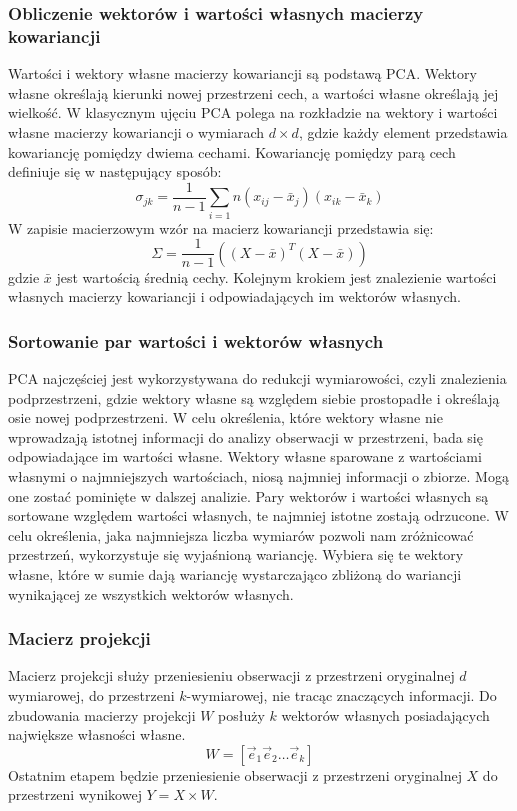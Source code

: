\documentclass[a4paper,12pt,twoside,openany]{report}
\begin{document}
\subsubsection{Obliczenie wektorów i wartości własnych macierzy kowariancji}
Wartości i wektory własne macierzy kowariancji są podstawą PCA.
Wektory własne określają kierunki nowej przestrzeni cech, a wartości własne określają jej wielkość.
W klasycznym ujęciu PCA polega na rozkładzie na wektory i wartości własne macierzy kowariancji o wymiarach $d \times d$,
gdzie każdy element przedstawia kowariancję pomiędzy dwiema cechami. 
Kowariancję pomiędzy parą cech definiuje się w następujący sposób:
\begin{equation}
	\sigma_{jk}=\frac{1}{n - 1}\sum_{i=1}{n}(x_{ij}-\bar x_j)(x_{ik} - \bar x_k)
\end{equation}
W zapisie macierzowym wzór na macierz kowariancji przedstawia się:
\begin{equation}
	\Sigma=\frac{1}{n - 1}\left((X-\bar x)^T(X - \bar x)\right)
\end{equation}
gdzie $\bar x$ jest wartością średnią cechy.
Kolejnym krokiem jest znalezienie wartości własnych macierzy kowariancji i odpowiadających im wektorów własnych.
\subsubsection{Sortowanie par wartości i wektorów własnych}
PCA najczęściej jest wykorzystywana do redukcji wymiarowości, 
czyli znalezienia podprzestrzeni, gdzie wektory własne są względem siebie prostopadłe 
i określają osie nowej podprzestrzeni.
W celu określenia, które wektory własne nie wprowadzają istotnej informacji do analizy obserwacji w przestrzeni, bada się odpowiadające im wartości własne.
Wektory własne sparowane z wartościami własnymi o najmniejszych wartościach, 
niosą najmniej informacji o zbiorze. 
Mogą one zostać pominięte w dalszej analizie.
Pary wektorów i wartości własnych są sortowane względem wartości własnych,
te najmniej istotne zostają odrzucone.
W celu określenia, jaka najmniejsza liczba wymiarów pozwoli nam zróżnicować przestrzeń,
wykorzystuje się wyjaśnioną wariancję.
Wybiera się te wektory własne, które w sumie dają wariancję wystarczająco zbliżoną do wariancji wynikającej ze wszystkich wektorów własnych.

\subsubsection{Macierz projekcji}
Macierz projekcji służy przeniesieniu obserwacji z przestrzeni oryginalnej $d$ wymiarowej,
do przestrzeni $k$-wymiarowej, nie tracąc znaczących informacji.
Do zbudowania macierzy projekcji $W$ posłuży $k$ wektorów własnych posiadających największe własności własne.
\begin{equation}
	W = [\vec e_1 \vec e_2 \dots \vec e_k]
\end{equation}
Ostatnim etapem będzie przeniesienie obserwacji z przestrzeni oryginalnej $X$ do przestrzeni wynikowej $Y = X \times W$.
\end{document}
